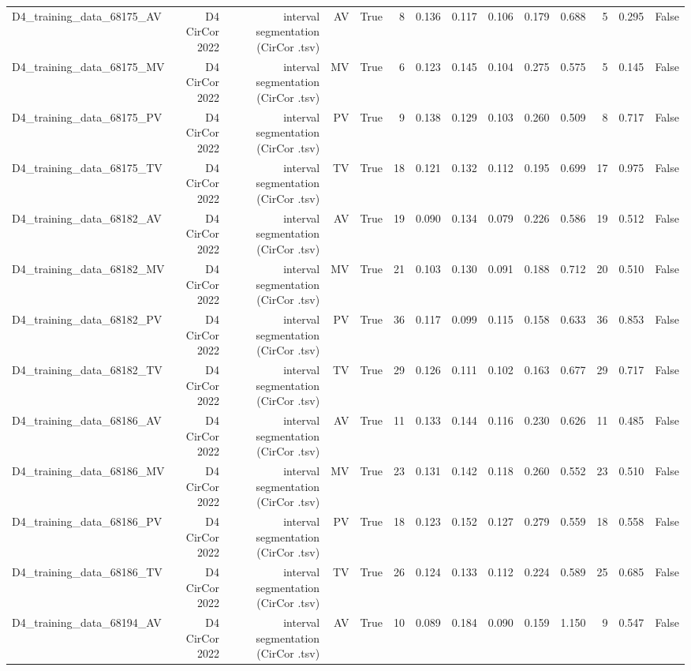 \begin{table}[htbp]
\begin{tabular}{lrrrrrrrrrrrrr}
    D4\_training\_data\_68175\_AV & D4 CirCor 2022 & interval segmentation (CirCor .tsv) & AV & True & 8 & 0.136 & 0.117 & 0.106 & 0.179 & 0.688 & 5 & 0.295 & False \\
    D4\_training\_data\_68175\_MV & D4 CirCor 2022 & interval segmentation (CirCor .tsv) & MV & True & 6 & 0.123 & 0.145 & 0.104 & 0.275 & 0.575 & 5 & 0.145 & False \\
    D4\_training\_data\_68175\_PV & D4 CirCor 2022 & interval segmentation (CirCor .tsv) & PV & True & 9 & 0.138 & 0.129 & 0.103 & 0.260 & 0.509 & 8 & 0.717 & False \\
    D4\_training\_data\_68175\_TV & D4 CirCor 2022 & interval segmentation (CirCor .tsv) & TV & True & 18 & 0.121 & 0.132 & 0.112 & 0.195 & 0.699 & 17 & 0.975 & False \\
    D4\_training\_data\_68182\_AV & D4 CirCor 2022 & interval segmentation (CirCor .tsv) & AV & True & 19 & 0.090 & 0.134 & 0.079 & 0.226 & 0.586 & 19 & 0.512 & False \\
    D4\_training\_data\_68182\_MV & D4 CirCor 2022 & interval segmentation (CirCor .tsv) & MV & True & 21 & 0.103 & 0.130 & 0.091 & 0.188 & 0.712 & 20 & 0.510 & False \\
    D4\_training\_data\_68182\_PV & D4 CirCor 2022 & interval segmentation (CirCor .tsv) & PV & True & 36 & 0.117 & 0.099 & 0.115 & 0.158 & 0.633 & 36 & 0.853 & False \\
    D4\_training\_data\_68182\_TV & D4 CirCor 2022 & interval segmentation (CirCor .tsv) & TV & True & 29 & 0.126 & 0.111 & 0.102 & 0.163 & 0.677 & 29 & 0.717 & False \\
    D4\_training\_data\_68186\_AV & D4 CirCor 2022 & interval segmentation (CirCor .tsv) & AV & True & 11 & 0.133 & 0.144 & 0.116 & 0.230 & 0.626 & 11 & 0.485 & False \\
    D4\_training\_data\_68186\_MV & D4 CirCor 2022 & interval segmentation (CirCor .tsv) & MV & True & 23 & 0.131 & 0.142 & 0.118 & 0.260 & 0.552 & 23 & 0.510 & False \\
    D4\_training\_data\_68186\_PV & D4 CirCor 2022 & interval segmentation (CirCor .tsv) & PV & True & 18 & 0.123 & 0.152 & 0.127 & 0.279 & 0.559 & 18 & 0.558 & False \\
    D4\_training\_data\_68186\_TV & D4 CirCor 2022 & interval segmentation (CirCor .tsv) & TV & True & 26 & 0.124 & 0.133 & 0.112 & 0.224 & 0.589 & 25 & 0.685 & False \\
    D4\_training\_data\_68194\_AV & D4 CirCor 2022 & interval segmentation (CirCor .tsv) & AV & True & 10 & 0.089 & 0.184 & 0.090 & 0.159 & 1.150 & 9 & 0.547 & False \\

\end{tabular}
\end{table}

